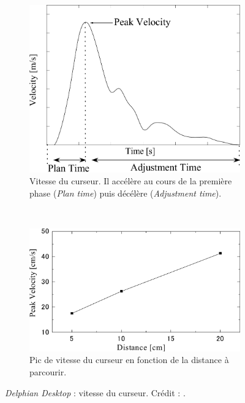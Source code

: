 	\begin{figure}[!htb]
		\begin{subfigure}[t]{0.44\textwidth}
			\centering
			\includegraphics[width=\textwidth]{figures/ch2/delphianPeak}
			\caption{Vitesse du curseur. Il accélère au cours de la première phase (\emph{Plan time}) puis décélère (\emph{Adjustment time}).}
			\label{fig:delphianPeak}
		\end{subfigure}
		~
		\begin{subfigure}[t]{0.54\textwidth}
			\centering
			\includegraphics[width=\textwidth]{figures/ch2/delphianSpeedDist}
			\caption{Pic de vitesse du curseur en fonction de la distance à parcourir.}
			\label{fig:delphianSpeedDist}
		\end{subfigure}
		\caption[\emph{Delphian Desktop} : vitesse du curseur]{\emph{Delphian Desktop} : vitesse du curseur. Crédit : \cite{asano2005predictive}.}
		\label{fig:delphianCursor}
	\end{figure}
	
